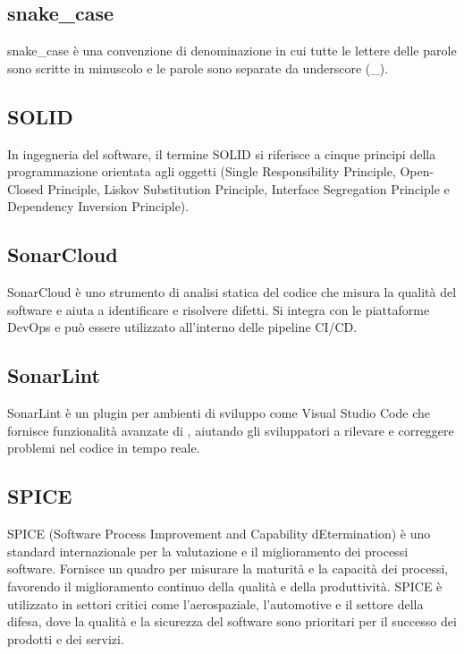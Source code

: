 \vspace{2em}
\subsection*{snake\_case}
\par snake\_case è una convenzione di denominazione in cui tutte le lettere delle parole sono scritte in minuscolo e le parole sono separate da underscore (\_).

\vspace{2em}
\subsection*{SOLID}
\par In ingegneria del software, il termine SOLID si riferisce a cinque principi della programmazione orientata agli oggetti (Single Responsibility Principle, Open-Closed Principle, Liskov Substitution Principle, Interface Segregation Principle e Dependency Inversion Principle).

\vspace{2em}
\subsection*{SonarCloud}
\par SonarCloud è uno strumento di analisi statica del codice che misura la qualità del software e aiuta a identificare e risolvere difetti. Si integra con le piattaforme DevOps e può essere utilizzato all'interno delle pipeline CI/CD. 

\vspace{2em}
\subsection*{SonarLint}
\par SonarLint è un plugin per ambienti di sviluppo come Visual Studio Code che fornisce funzionalità avanzate di , aiutando gli sviluppatori a rilevare e correggere problemi nel codice in tempo reale.

\vspace{2em}
\subsection*{SPICE}
\par SPICE (Software Process Improvement and Capability dEtermination) è uno standard internazionale per la valutazione e il miglioramento dei processi software. Fornisce un quadro per misurare la maturità e la capacità dei processi, favorendo il miglioramento continuo della qualità e della produttività. SPICE è utilizzato in settori critici come l'aerospaziale, l'automotive e il settore della difesa, dove la qualità e la sicurezza del software sono prioritari per il successo dei prodotti e dei servizi.

